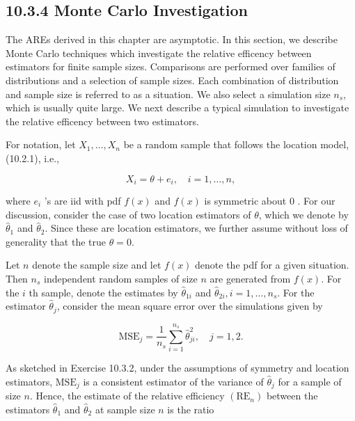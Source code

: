 \subsection*{10.3.4 Monte Carlo Investigation}
The AREs derived in this chapter are asymptotic. In this section, we describe Monte Carlo techniques which investigate the relative efficency between estimators for finite sample sizes. Comparisons are performed over families of distributions and a selection of sample sizes. Each combination of distribution and sample size is referred to as a situation. We also select a simulation size $n_{s}$, which is usually quite large. We next describe a typical simulation to investigate the relative efficency between two estimators.

For notation, let $X_{1}, \ldots, X_{n}$ be a random sample that follows the location model, (10.2.1), i.e.,


\begin{equation*}
X_{i}=\theta+e_{i}, \quad i=1, \ldots, n, \tag{10.3.35}
\end{equation*}


where $e_{i}$ 's are iid with pdf $f(x)$ and $f(x)$ is symmetric about 0 . For our discussion, consider the case of two location estimators of $\theta$, which we denote by $\widehat{\theta}_{1}$ and $\widehat{\theta}_{2}$. Since these are location estimators, we further assume without loss of generality that the true $\theta=0$.

Let $n$ denote the sample size and let $f(x)$ denote the pdf for a given situation. Then $n_{s}$ independent random samples of size $n$ are generated from $f(x)$. For the $i$ th sample, denote the estimates by $\widehat{\theta}_{1 i}$ and $\widehat{\theta}_{2 i}, i=1, \ldots, n_{s}$. For the estimator $\widehat{\theta}_{j}$, consider the mean square error over the simulations given by


\begin{equation*}
\mathrm{MSE}_{j}=\frac{1}{n_{s}} \sum_{i=1}^{n_{s}} \widehat{\theta}_{j i}^{2}, \quad j=1,2 . \tag{10.3.36}
\end{equation*}


As sketched in Exercise 10.3.2, under the assumptions of symmetry and location estimators, $\mathrm{MSE}_{j}$ is a consistent estimator of the variance of $\widehat{\theta}_{j}$ for a sample of size $n$. Hence, the estimate of the relative efficiency $\left(\mathrm{RE}_{n}\right)$ between the estimators $\widehat{\theta}_{1}$ and $\widehat{\theta}_{2}$ at sample size $n$ is the ratio


